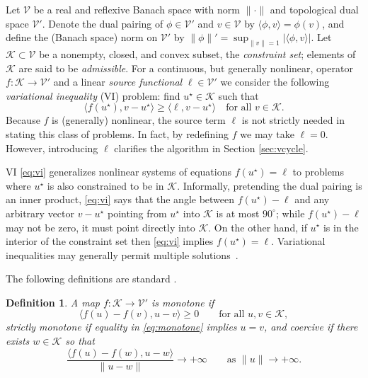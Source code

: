\documentclass[letterpaper,final,12pt,reqno]{amsart}
\theoremstyle{cstyle}
\theoremstyle{cstyle*}
\theoremstyle{dstyle}
\newtheorem{definition}[theorem]{Definition}
\numberwithin{equation}{section}
\numberwithin{figure}{section}
\numberwithin{table}{section}
\numberwithin{theorem}{section}
\newcommand{\cK}{\mathcal{K}}
\newcommand{\cV}{\mathcal{V}}
\newcommand{\ip}[2]{\langle#1,#2\rangle}
\begin{document}
Let $\cV$ be a real and reflexive Banach space with norm $\|\cdot\|$ and topological dual space $\cV'$.  Denote the dual pairing of $\phi \in \cV'$ and $v\in\cV$ by $\ip{\phi}{v} = \phi(v)$, and define the (Banach space) norm on $\cV'$ by $\|\phi\|' = \sup_{\|v\|=1} |\ip{\phi}{v}|$.  Let $\cK \subset \cV$ be a nonempty, closed, and convex subset, the \emph{constraint set}; elements of $\cK$ are said to be \emph{admissible}.  For a continuous, but generally nonlinear, operator $f:\cK \to \cV'$ and a linear \emph{source functional} $\ell\in \cV'$ we consider the following \emph{variational inequality} (VI) problem: find $u^\star\in \cK$ such that
\begin{equation}
\ip{f(u^\star)}{v-u^\star} \ge \ip{\ell}{v-u^\star} \quad \text{for all } v\in \cK. \label{eq:vi}
\end{equation}
Because $f$ is (generally) nonlinear, the source term $\ell$ is not strictly needed in stating this class of problems.  In fact, by redefining $f$ we may take $\ell=0$.  However, introducing $\ell$ clarifies the algorithm in Section \ref{sec:vcycle}.

VI \eqref{eq:vi} generalizes nonlinear systems of equations $f(u^\star)=\ell$ to problems where $u^\star$ is also constrained to be in $\cK$.  Informally, pretending the dual pairing is an inner product, \eqref{eq:vi} says that the angle between $f(u^\star)-\ell$ and any arbitrary vector $v-u^\star$ pointing from $u^\star$ into $\cK$ is at most $90^\circ$; while $f(u^\star)-\ell$ may not be zero, it must point directly into $\cK$.  On the other hand, if $u^\star$ is in the interior of the constraint set then \eqref{eq:vi} implies $f(u^\star)=\ell$.
Variational inequalities may generally permit multiple solutions~\cite{Farrell2019}.

The following definitions are standard \cite{KinderlehrerStampacchia1980}.

\begin{definition}  A map $f:\cK \to \cV'$ is \emph{monotone} if
\begin{equation}
\ip{f(u)-f(v)}{u-v} \ge 0 \qquad \text{for all } u,v \in \cK, \label{eq:monotone}
\end{equation}
\emph{strictly monotone} if equality in \eqref{eq:monotone} implies $u=v$, and \emph{coercive} if there exists $w \in \cK$ so that
\begin{equation}
\frac{\ip{f(u)-f(w)}{u-w}}{\|u-w\|} \to +\infty \qquad \text{as } \|u\|\to +\infty. \label{eq:coercive}
\end{equation}
\end{definition}
\end{document}
